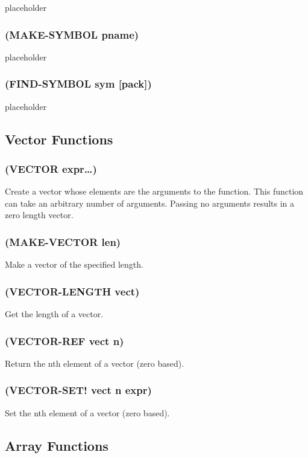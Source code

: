 \documentclass[11pt]{article}
\begin{document}
placeholder
\subsubsection{(MAKE-SYMBOL pname)}
\label{sec-4-17-16}

placeholder
\subsubsection{(FIND-SYMBOL sym [pack])}
\label{sec-4-17-17}

placeholder
\subsection{Vector Functions}
\label{sec-4-18}

\subsubsection{(VECTOR expr\ldots{})}
\label{sec-4-18-1}

Create a vector whose elements are the arguments to the function.
This function can take an arbitrary number of arguments.  Passing no
arguments results in a zero length vector.
\subsubsection{(MAKE-VECTOR len)}
\label{sec-4-18-2}

Make a vector of the specified length.
\subsubsection{(VECTOR-LENGTH vect)}
\label{sec-4-18-3}

Get the length of a vector.
\subsubsection{(VECTOR-REF vect n)}
\label{sec-4-18-4}

Return the nth element of a vector (zero based).
\subsubsection{(VECTOR-SET! vect n expr)}
\label{sec-4-18-5}

Set the nth element of a vector (zero based).
\subsection{Array Functions}
\label{sec-4-19}
\end{document}
